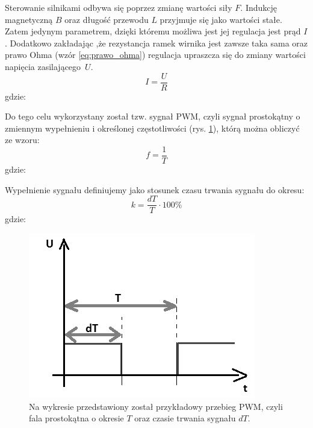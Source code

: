 \noindent
Sterowanie silnikami odbywa się poprzez zmianę wartości siły $F$. Indukcję magnetyczną $B$ oraz długość przewodu $L$ przyjmuje się jako wartości stałe. Zatem jedynym parametrem, dzięki któremu możliwa jest jej regulacja jest prąd $I$. Dodatkowo zakładając ,że rezystancja ramek wirnika jest zawsze taka sama oraz prawo Ohma (wzór \ref{eq:prawo_ohma}) regulacja upraszcza się do zmiany wartości napięcia zasilającego~$U$. 
\begin{equation}
	I = \frac{U}{R}
   \label{eq:prawo_ohma}
 \end{equation}
 gdzie:  
 \begin{equationDescriptor}
 \end{equationDescriptor}
\noindent
Do tego celu wykorzystany został tzw. sygnał PWM, czyli sygnał prostokątny o zmiennym wypełnieniu i określonej częstotliwości (rys. \ref{sygnal_PWM}), którą można obliczyć ze wzoru:
\begin{equation}
	f =  \frac{1}{T}
   \label{eq:czestotliwosc}
 \end{equation}
 gdzie:  
 \begin{equationDescriptor}
 \end{equationDescriptor}
\noindent
 Wypełnienie sygnału definiujemy jako stosunek czasu trwania sygnału do okresu:
 \begin{equation}
	k =  \frac{dT}{T} \cdot 100\%
   \label{eq:wsp_wypelnienia}
 \end{equation}
 gdzie:  
 \begin{equationDescriptor}
 \end{equationDescriptor}
 \newpage
  \begin{figure}[H]
    \begin{center}
      \includegraphics[scale=0.65]{imgs/wykres.png}
 	\caption[Sygnał PWM.]{\small{Na wykresie przedstawiony został przykładowy przebieg PWM, czyli fala prostokątna o okresie $T$ oraz czasie trwania sygnału $dT$.}}
	\label{sygnal_PWM}
    \end{center}
  \end{figure}  
